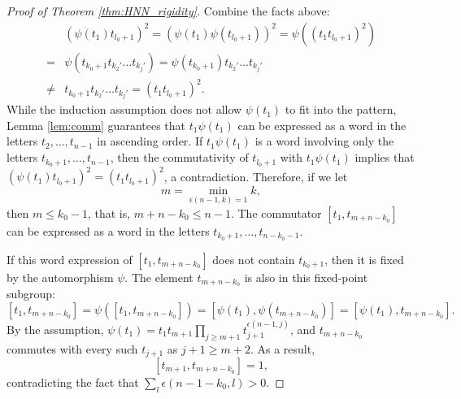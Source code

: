 \documentclass[10pt,a4paper]{amsart}
\begin{document}
\begin{proof}[Proof of Theorem \ref{thm:HNN_rigidity}]
    Combine the facts above:
    \[
    \begin{split}
        & (\psi(t_1)t_{l_0+1})^2 = (\psi(t_1)\psi(t_{l_0+1}))^2 = \psi((t_1t_{l_0+1})^2) \\
        = & \psi(t_{k_0+1} t_{k_2'}\dots t_{k_j'}) = \psi(t_{k_0+1})t_{k_2'}\dots t_{k_j'} \\
        \neq & t_{k_0+1}t_{k_2'}\dots t_{k_j'} = (t_1t_{l_0+1})^2.
    \end{split}
    \]
    While the induction assumption does not allow $\psi(t_1)$ to fit into the pattern, Lemma \ref{lem:comm} guarantees that $t_1\psi(t_1)$ can be expressed as a word in the letters $t_2,\dots,t_{n-1}$ in ascending order. If $t_1\psi(t_1)$ is a word involving only the letters $t_{k_0+1},\dots,t_{n-1}$, then the commutativity of $t_{l_0+1}$ with $t_1\psi(t_1)$ implies that $(\psi(t_1)t_{l_0+1})^2 = (t_1t_{l_0+1})^2$, a contradiction. Therefore, if we let
    \[
        m = \min_{\epsilon(n-1,k)=1}k,
    \]
    then $m\leq k_0-1$, that is, $m+n-k_0\leq n-1$. The commutator $[t_1,t_{m+n-k_0}]$ can be expressed as a word in the letters $t_{k_0+1},\dots,t_{n-k_0-1}$.

    If this word expression of $[t_1,t_{m+n-k_0}]$ does not contain $t_{k_0+1}$, then it is fixed by the automorphism $\psi$. The element $t_{m+n-k_0}$ is also in this fixed-point subgroup:
    \[
        [t_1,t_{m+n-k_0}] = \psi([t_1,t_{m+n-k_0}]) = [\psi(t_1),\psi(t_{m+n-k_0})] = [\psi(t_1),t_{m+n-k_0}].
    \]
    By the assumption, $\psi(t_1) = t_1t_{m+1}\prod_{j\geq m+1}t_{j+1}^{\epsilon(n-1, j)}$, and $t_{m+n-k_0}$ commutes with every such $t_{j+1}$ as $j+1\geq m+2$. As a result,
    \[
        [t_{m+1},t_{m+n-k_0}] = 1,
    \]
    contradicting the fact that $\sum_l\epsilon(n-1-k_0,l)>0$.
    

\end{proof}
\end{document}
